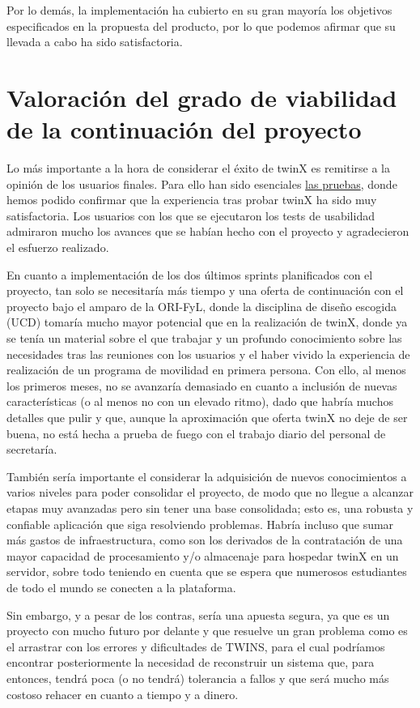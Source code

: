 Por lo demás, la implementación ha cubierto en su gran mayoría los objetivos especificados en la propuesta del producto, por lo que podemos afirmar que su llevada a cabo ha sido satisfactoria.

\section{Valoración del grado de viabilidad de la continuación del proyecto}

Lo más importante a la hora de considerar el éxito de twinX es remitirse a la opinión de los usuarios finales. Para ello han sido esenciales \hyperref[pruebas]{las pruebas}, donde hemos podido confirmar que la experiencia tras probar twinX ha sido muy satisfactoria. Los usuarios con los que se ejecutaron los tests de usabilidad admiraron mucho los avances que se habían hecho con el proyecto y agradecieron el esfuerzo realizado.

En cuanto a implementación de los dos últimos sprints planificados con el proyecto, tan solo se necesitaría más tiempo y una oferta de continuación con el proyecto bajo el amparo de la ORI-FyL, donde la disciplina de diseño escogida (UCD) tomaría mucho mayor potencial que en la realización de twinX, donde ya se tenía un material sobre el que trabajar y un profundo conocimiento sobre las necesidades tras las reuniones con los usuarios y el haber vivido la experiencia de realización de un programa de movilidad en primera persona. Con ello, al menos los primeros meses, no se avanzaría demasiado en cuanto a inclusión de nuevas características (o al menos no con un elevado ritmo), dado que habría muchos detalles que pulir y que, aunque la aproximación que oferta twinX no deje de ser buena, no está hecha a prueba de fuego con el trabajo diario del personal de secretaría.

También sería importante el considerar la adquisición de nuevos conocimientos a varios niveles para poder consolidar el proyecto, de modo que no llegue a alcanzar etapas muy avanzadas pero sin tener una base consolidada; esto es, una robusta y confiable aplicación que siga resolviendo problemas. Habría incluso que sumar más gastos de infraestructura, como son los derivados de la contratación de una mayor capacidad de procesamiento y/o almacenaje para hospedar twinX en un servidor, sobre todo teniendo en cuenta que se espera que numerosos estudiantes de todo el mundo se conecten a la plataforma.

Sin embargo, y a pesar de los contras, sería una apuesta segura, ya que es un proyecto con mucho futuro por delante y que resuelve un gran problema como es el arrastrar con los errores y dificultades de TWINS, para el cual podríamos encontrar posteriormente la necesidad de reconstruir un sistema que, para entonces, tendrá poca (o no tendrá) tolerancia a fallos y que será mucho más costoso rehacer en cuanto a tiempo y a dinero.

